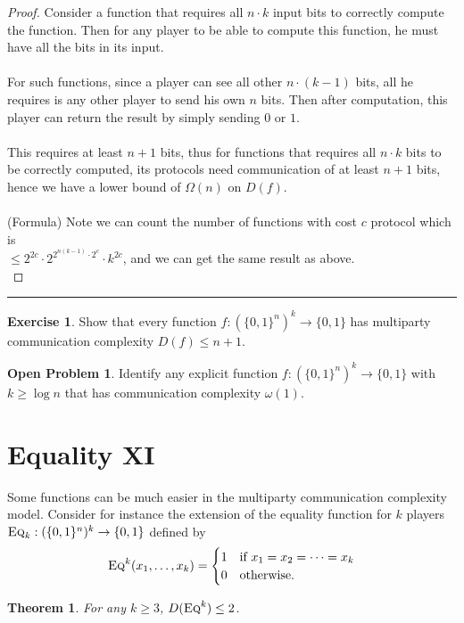 \documentclass[11pt,oneside]{book}
\theoremstyle{plain}
\newtheorem{theorem}{Theorem}
\theoremstyle{definition}
\newtheorem{exercise}{Exercise}
\newtheorem{open}{Open Problem}
\theoremstyle{plain}
\newcommand{\Eq}{\textsc{Eq}}
\newcommand{\exercises}{\bigskip \noindent\rule{8cm}{0.4pt} \medskip}
\begin{document}
	\begin{proof}
		Consider a function that requires all $n\cdot k$ input bits to correctly compute the function. Then for any player to be able to compute this function, he must have all the bits in its input.\\
		\\
		For such functions, since a player can see all other $n\cdot (k-1)$ bits, all he requires is any other player to send his own $n$ bits. Then after computation, this player can return the result by simply sending $0$ or $1$.\\
		\\
		This requires at least $n+1$ bits, thus for functions that requires all $n\cdot k$ bits to be correctly computed, its protocols need communication of at least $n+1$ bits, hence we have a lower bound of $\Omega(n)$ on $D(f)$.\\
		 \\
		(Formula) Note  we can count the number of functions with cost $c$ protocol which is\\
		 $\leq2^{2c}\cdot 2^{2^{n(k-1)}\cdot 2^c}\cdot k^{2c}$, and we can get the same result as above.\\
	\end{proof}
	
	\exercises
	
	\begin{exercise}
		Show that every function $f : (\{0,1\}^{n})^k \to \{0,1\}$ has multiparty communication complexity $D(f) \le n+1$.
	\end{exercise}
	
	\begin{open}
		Identify any explicit function $f : (\{0,1\}^{n})^k \to \{0,1\}$ with $k \ge \log n$ that has communication complexity $\omega(1)$.
	\end{open}
	
	
	 
	\section{Equality XI}
	
	Some functions can be much easier in the multiparty communication complexity model. Consider for instance the extension of the equality function for $k$ players $\Eq_k : (\{0,1\}^n)^k \to \{0,1\}$ defined by
	\[
	\Eq^k(x_1,\ldots,x_k) = \begin{cases}
	1 & \mbox{if } x_1 = x_2 = \cdots = x_k \\
	0 & \mbox{otherwise.}
	\end{cases}
	\]
	\begin{theorem}
		For any $k \ge 3$, $D(\Eq^k) \le 2$.
	\end{theorem}
	
\end{document}

